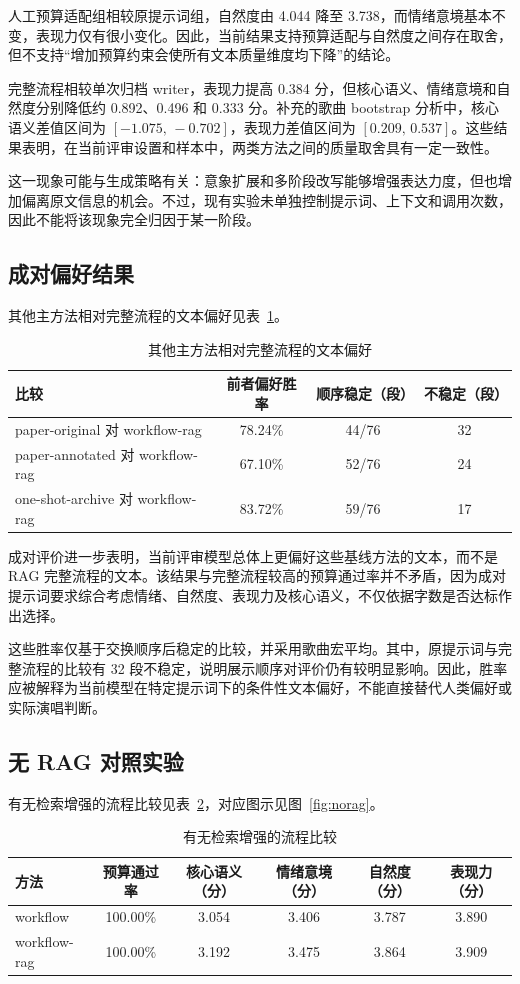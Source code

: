 \documentclass[12pt, a4paper]{ctexart}
\numberwithin{table}{section}
\numberwithin{figure}{section}
\begin{document}
人工预算适配组相较原提示词组，自然度由 4.044 降至 3.738，而情绪意境基本不变，表现力仅有很小变化。因此，当前结果支持预算适配与自然度之间存在取舍，但不支持“增加预算约束会使所有文本质量维度均下降”的结论。

完整流程相较单次归档 writer，表现力提高 0.384 分，但核心语义、情绪意境和自然度分别降低约 0.892、0.496 和 0.333 分。补充的歌曲 bootstrap 分析中，核心语义差值区间为 $[-1.075,\,-0.702]$，表现力差值区间为 $[0.209,\,0.537]$。这些结果表明，在当前评审设置和样本中，两类方法之间的质量取舍具有一定一致性。

这一现象可能与生成策略有关：意象扩展和多阶段改写能够增强表达力度，但也增加偏离原文信息的机会。不过，现有实验未单独控制提示词、上下文和调用次数，因此不能将该现象完全归因于某一阶段。

\subsection{成对偏好结果}
其他主方法相对完整流程的文本偏好见表~\ref{tab:pref}。
\begin{table}[htbp]
  \centering
  \caption{其他主方法相对完整流程的文本偏好}
  \label{tab:pref}
  \begin{tabular}{lccc}
    \toprule
    比较 & 前者偏好胜率 & 顺序稳定（段） & 不稳定（段） \\
    \midrule
    paper-original 对 workflow-rag   & 78.24\% & 44/76 & 32 \\
    paper-annotated 对 workflow-rag  & 67.10\% & 52/76 & 24 \\
    one-shot-archive 对 workflow-rag & 83.72\% & 59/76 & 17 \\
    \bottomrule
  \end{tabular}
\end{table}

成对评价进一步表明，当前评审模型总体上更偏好这些基线方法的文本，而不是 RAG 完整流程的文本。该结果与完整流程较高的预算通过率并不矛盾，因为成对提示词要求综合考虑情绪、自然度、表现力及核心语义，不仅依据字数是否达标作出选择。

这些胜率仅基于交换顺序后稳定的比较，并采用歌曲宏平均。其中，原提示词与完整流程的比较有 32 段不稳定，说明展示顺序对评价仍有较明显影响。因此，胜率应被解释为当前模型在特定提示词下的条件性文本偏好，不能直接替代人类偏好或实际演唱判断。

\subsection{无 RAG 对照实验}
有无检索增强的流程比较见表~\ref{tab:norag}，对应图示见图~\ref{fig:norag}。
\begin{table}[htbp]
  \centering
  \caption{有无检索增强的流程比较}
  \label{tab:norag}
  \begin{tabular}{lccccc}
    \toprule
    方法 & 预算通过率 & 核心语义（分） & 情绪意境（分） & 自然度（分） & 表现力（分） \\
    \midrule
    workflow     & 100.00\% & 3.054 & 3.406 & 3.787 & 3.890 \\
    workflow-rag & 100.00\% & 3.192 & 3.475 & 3.864 & 3.909 \\
    \bottomrule
  \end{tabular}
\end{table}
\end{document}
